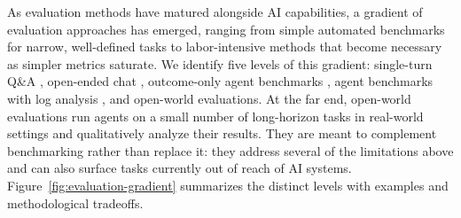 \documentclass{article}
\begin{document}
As evaluation methods have matured alongside AI capabilities, a gradient of evaluation approaches has emerged, ranging from simple automated benchmarks for narrow, well-defined tasks to labor-intensive methods that become necessary as simpler metrics saturate. We identify five levels of this gradient: single-turn Q\&A \citep{arxivabs200903300, arxivabs231112022, cobbe2021training}, open-ended chat \citep{arxivabs240604770, githubComLmarenaArena}, outcome-only agent benchmarks \citep{arxivabs231006770, arxivabs230713854}, agent benchmarks with log analysis \citep{aisiGovUkBlog, metrOrgTimeHorizons}, and open-world evaluations. At the far end, open-world evaluations run agents on a small number of long-horizon tasks in real-world settings and qualitatively analyze their results. They are meant to complement benchmarking rather than replace it: they address several of the limitations above and can also surface tasks currently out of reach of AI systems. Figure~\ref{fig:evaluation-gradient} summarizes the distinct levels with examples and methodological tradeoffs.
\end{document}
